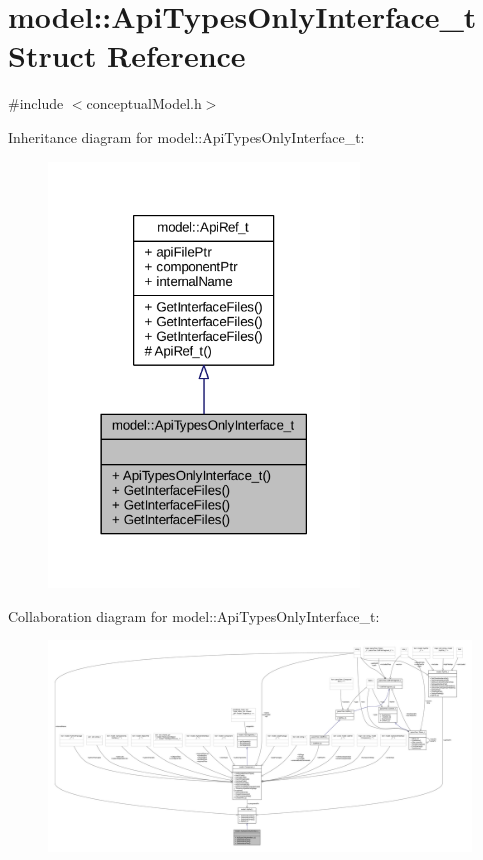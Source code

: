 \hypertarget{structmodel_1_1_api_types_only_interface__t}{}\section{model\+:\+:Api\+Types\+Only\+Interface\+\_\+t Struct Reference}
\label{structmodel_1_1_api_types_only_interface__t}


{\ttfamily \#include $<$conceptual\+Model.\+h$>$}



Inheritance diagram for model\+:\+:Api\+Types\+Only\+Interface\+\_\+t\+:
\nopagebreak
\begin{figure}[H]
\begin{center}
\leavevmode
\includegraphics[width=234pt]{structmodel_1_1_api_types_only_interface__t__inherit__graph}
\end{center}
\end{figure}


Collaboration diagram for model\+:\+:Api\+Types\+Only\+Interface\+\_\+t\+:
\nopagebreak
\begin{figure}[H]
\begin{center}
\leavevmode
\includegraphics[width=350pt]{structmodel_1_1_api_types_only_interface__t__coll__graph}
\end{center}
\end{figure}
